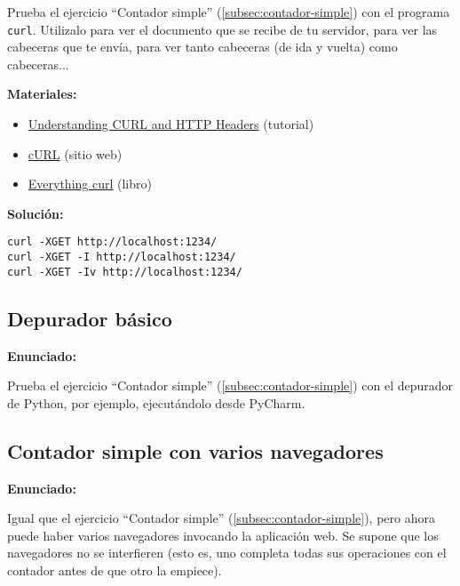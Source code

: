 Prueba el ejercicio ``Contador simple'' (\ref{subsec:contador-simple}) con el programa \verb|curl|. Utilizalo para ver el documento que se recibe de tu servidor, para ver las cabeceras que te envía, para ver tanto cabeceras (de ida y vuelta) como cabeceras...

\textbf{Materiales:}

\begin{itemize}
\item \href{https://linuxacademy.com/guide/13852-understanding-curl-and-http-headers/}{Understanding CURL and HTTP Headers} (tutorial)
\item \href{https://curl.haxx.se/}{cURL} (sitio web)
\item \href{https://curl.haxx.se/book.html}{Everything curl} (libro)
\end{itemize}

\textbf{Solución:}

\begin{verbatim}
curl -XGET http://localhost:1234/
curl -XGET -I http://localhost:1234/
curl -XGET -Iv http://localhost:1234/
\end{verbatim}


\subsection{Depurador básico}
\label{subsec:depurador-basico}

\textbf{Enunciado:}

Prueba el ejercicio ``Contador simple'' (\ref{subsec:contador-simple}) con el depurador de Python, por ejemplo, ejecutándolo desde PyCharm.


\subsection{Contador simple con varios navegadores}
\label{subsec:contador-simple-varios}

\textbf{Enunciado:}

Igual que el ejercicio ``Contador simple'' (\ref{subsec:contador-simple}), pero ahora puede haber varios navegadores invocando la aplicación web. Se supone que los navegadores no se interfieren (esto es, uno completa todas sus operaciones con el contador antes de que otro la empiece).

